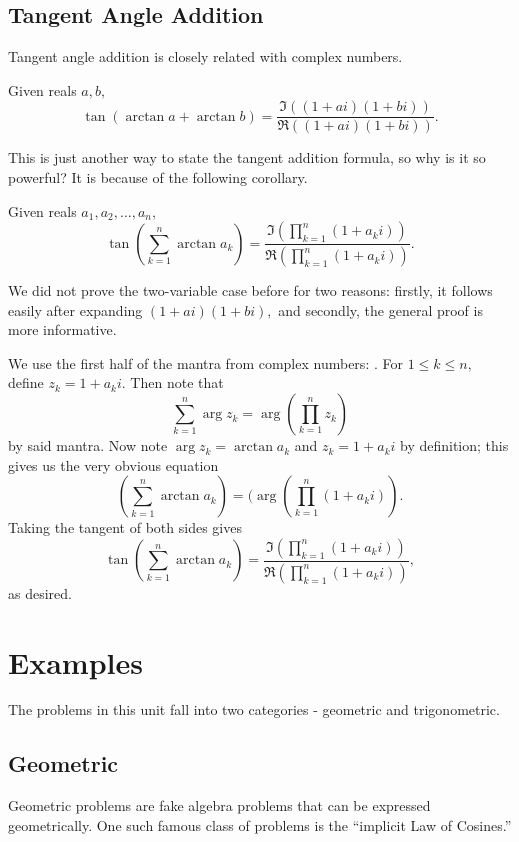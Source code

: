 \documentclass{article}
\begin{document}
\subsection{Tangent Angle Addition}

Tangent angle addition is closely related with complex numbers.

\begin{theo}
Given reals $a,b,$
\[\tan(\arctan a + \arctan b)=\frac{\Im\left((1+ai)(1+bi)\right)}{\Re\left((1+ai)(1+bi)\right)}.\]
\end{theo}

This is just another way to state the tangent addition formula, so why is it so powerful? It is because of the following corollary.

\begin{corollary}
Given reals $a_1,a_2,\ldots,a_n,$
\[\tan\left(\sum_{k=1}^n \arctan a_k\right) = \frac{\Im\left(\prod\limits_{k=1}^n (1+a_ki)\right)}{\Re\left(\prod\limits_{k=1}^n (1+a_ki)\right)}.\]
\end{corollary}

We did not prove the two-variable case before for two reasons: firstly, it follows easily after expanding $(1+ai)(1+bi),$ and secondly, the general proof is more informative.

\begin{pro}
We use the first half of the mantra from complex numbers: . For $1\leq k\leq n,$ define $z_k=1+a_ki.$ Then note that
\[\sum_{k=1}^n\arg z_k=\arg\left(\prod\limits_{k=1}^n z_k\right)\]
by said mantra. Now note $\arg z_k=\arctan a_k$ and $z_k=1+a_ki$ by definition; this gives us the very obvious equation
\[\left(\sum_{k=1}^n \arctan a_k\right) = (\arg\left(\prod\limits_{k=1}^n (1+a_ki)\right).\]
Taking the tangent of both sides gives
\[\tan\left(\sum_{k=1}^n \arctan a_k\right) = \frac{\Im\left(\prod\limits_{k=1}^n (1+a_ki)\right)}{\Re\left(\prod\limits_{k=1}^n (1+a_ki)\right)},\]
as desired.
\end{pro}

\pagebreak

\section{Examples}
The problems in this unit fall into two categories - geometric and trigonometric.

\subsection{Geometric}
Geometric problems are fake algebra problems that can be expressed geometrically. One such famous class of problems is the ``implicit Law of Cosines.''
\end{document}

